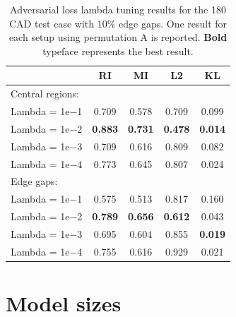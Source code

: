 \documentclass{article}
\begin{document}
\begin{table}[h]
  \caption{Adversarial loss lambda tuning results for the 180 CAD test case with 10\% edge gaps. One result for each setup using permutation A is reported. \textbf{Bold} typeface represents the best result.}
  \label{tab:adver}
  \centering
  \footnotesize
  \begin{tabular}{lcccc}
    \toprule
         & RI     & MI  & L2 & KL \\
    \midrule
    Central regions: & & & & \\
    \; Lambda = 1e$-$1 & 0.709 & 0.578 & 0.709 & 0.099 \\
    \; Lambda = 1e$-$2 & \textbf{0.883} & \textbf{0.731} & \textbf{0.478} & \textbf{0.014} \\
    \; Lambda = 1e$-$3 & 0.709 & 0.616 & 0.809 & 0.082 \\
    \; Lambda = 1e$-$4 & 0.773 & 0.645 & 0.807 & 0.024 \\
    \midrule
    Edge gaps: &&&&\\
    \; Lambda = 1e$-$1 & 0.575 & 0.513 & 0.817 & 0.160 \\
    \; Lambda = 1e$-$2 & \textbf{0.789} & \textbf{0.656} & \textbf{0.612} & 0.043 \\
    \; Lambda = 1e$-$3 & 0.695 & 0.604 & 0.855 & \textbf{0.019} \\
    \; Lambda = 1e$-$4 & 0.755 & 0.616 & 0.929 & 0.021 \\
    \bottomrule
  \end{tabular}
\end{table}


\newpage
\section{Model sizes}
\label{app:modelsizes}
\end{document}
